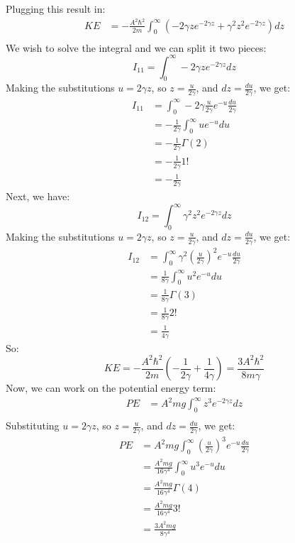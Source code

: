 \documentclass{article}[16pt]
\begin{document}
Plugging this result in:
\begin{align*}
    KE &= -\frac{A^2\hbar^2}{2m} \int_{0}^{\infty} \left(-2\gamma z e^{-2\gamma z} + \gamma^2 z^2 e^{-2\gamma z}\right) dz \\
\end{align*}
We wish to solve the integral and we can split it two pieces:
\begin{equation}
    I_{11} = \int_{0}^{\infty} -2\gamma z e^{-2\gamma z} dz
\end{equation}
Making the substitutions $u = 2\gamma z$, so $z = \frac{u}{2\gamma}$, and $dz = \frac{du}{2\gamma}$, we get:
\begin{align*}
    I_{11} &= \int_{0}^{\infty} -2\gamma \frac{u}{2\gamma} e^{-u} \frac{du}{2\gamma} \\
    &= -\frac{1}{2\gamma} \int_{0}^{\infty} u e^{-u} du \\
    &= -\frac{1}{2\gamma} \Gamma(2) \\
    &= -\frac{1}{2\gamma} 1! \\
    &= -\frac{1}{2\gamma}
\end{align*}
Next, we have:
\begin{equation}
    I_{12} = \int_{0}^{\infty} \gamma^2 z^2 e^{-2\gamma z} dz
\end{equation}
Making the substitutions $u = 2\gamma z$, so $z = \frac{u}{2\gamma}$, and $dz = \frac{du}{2\gamma}$, we get:
\begin{align*}
    I_{12} &= \int_{0}^{\infty} \gamma^2 \left(\frac{u}{2\gamma}\right)^2 e^{-u} \frac{du}{2\gamma} \\
    &= \frac{1}{8\gamma} \int_{0}^{\infty} u^2 e^{-u} du \\
    &= \frac{1}{8\gamma} \Gamma(3) \\
    &= \frac{1}{8\gamma} 2! \\
    &= \frac{1}{4\gamma}
\end{align*}
So:
\begin{equation}
    KE = -\frac{A^2\hbar^2}{2m} \left(-\frac{1}{2\gamma} + \frac{1}{4\gamma}\right) =\boxed{\frac{3A^2\hbar^2}{8m\gamma}}
\end{equation}
Now, we can work on the potential energy term:
\begin{align*}
    PE &= A^2mg \int_{0}^{\infty} z^3 e^{-2\gamma z} dz \\
\end{align*}
Substituting $u = 2\gamma z$, so $z = \frac{u}{2\gamma}$, and $dz = \frac{du}{2\gamma}$, we get:
\begin{align*}
    PE &= A^2mg \int_{0}^{\infty} \left(\frac{u}{2\gamma}\right)^3 e^{-u} \frac{du}{2\gamma} \\
    &= \frac{A^2mg}{16\gamma^4} \int_{0}^{\infty} u^3 e^{-u} du \\
    &= \frac{A^2mg}{16\gamma^4} \Gamma(4) \\
    &= \frac{A^2mg}{16\gamma^4} 3! \\
    &=\boxed{\frac{3A^2mg}{8\gamma^4}}
\end{align*}
\end{document}

